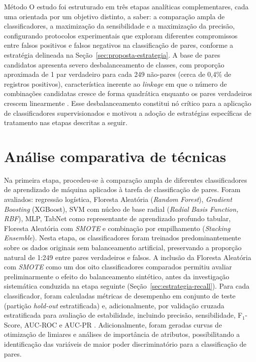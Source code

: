 \begin{chapter}{Método}
O estudo foi estruturado em três etapas analíticas complementares, cada uma orientada por um objetivo distinto, a saber: a comparação ampla de classificadores, a maximização da sensibilidade e a maximização da precisão, configurando protocolos experimentais que exploram diferentes compromissos entre falsos positivos e falsos negativos na classificação de pares, conforme a estratégia delineada na Seção~\ref{sec:proposta-estrategia}. A base de pares candidatos apresenta severo desbalanceamento de classes, com proporção aproximada de 1 par verdadeiro para cada 249 não-pares (cerca de 0,4\% de registros positivos), característica inerente ao \textit{linkage} em que o número de combinações candidatas cresce de forma quadrática enquanto os pares verdadeiros crescem linearmente \cite{Christen2012book, He2009imbalanced}. Esse desbalanceamento constitui nó crítico para a aplicação de classificadores supervisionados e motivou a adoção de estratégias específicas de tratamento nas etapas descritas a seguir.

\section{Análise comparativa de técnicas}\label{sec:analise-comparativa}

Na primeira etapa, procedeu-se à comparação ampla de diferentes classificadores de aprendizado de máquina aplicados à tarefa de classificação de pares. Foram avaliados: regressão logística, Floresta Aleatória (\textit{Random Forest}), \textit{Gradient Boosting} (XGBoost), SVM com núcleo de base radial (\textit{Radial Basis Function, RBF}), MLP, TabNet \cite{Arik2021tabnet} como representante de aprendizado profundo tabular, Floresta Aleatória com \textit{SMOTE} e combinação por empilhamento (\textit{Stacking Ensemble}). Nesta etapa, os classificadores foram treinados predominantemente sobre os dados originais sem balanceamento artificial, preservando a proporção natural de 1:249 entre pares verdadeiros e falsos. A inclusão da Floresta Aleatória com \textit{SMOTE} como um dos oito classificadores comparados permitiu avaliar preliminarmente o efeito do balanceamento sintético, antes da investigação sistemática conduzida na etapa seguinte (Seção~\ref{sec:estrategia-recall}). Para cada classificador, foram calculadas métricas de desempenho em conjunto de teste (partição \textit{hold-out} estratificada) e, adicionalmente, por validação cruzada estratificada para avaliação de estabilidade, incluindo precisão, sensibilidade, F$_1$-Score, AUC-ROC e AUC-PR \cite{Hastie2009elements, Hand2018fmeasure}. Adicionalmente, foram geradas curvas de otimização de limiares e análises de importância de atributos, possibilitando a identificação das variáveis de maior poder discriminatório para a classificação de pares.


\end{chapter}
